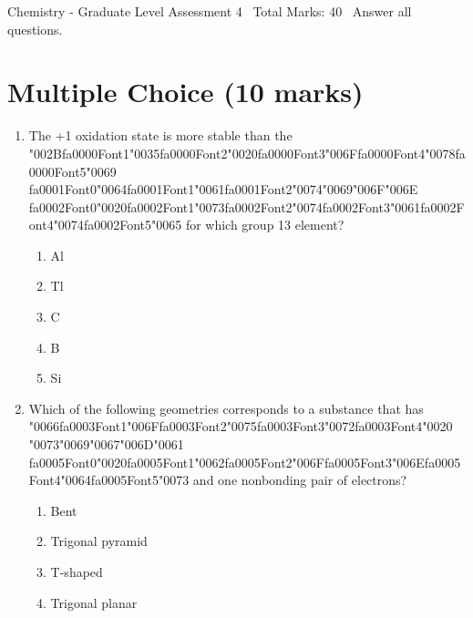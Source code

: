 \documentclass[12pt]{article}
\begin{document}
\begin{center}
Chemistry - Graduate Level Assessment 4 \
Total Marks: 40 \
Answer all questions.
\end{center}

\section*{Multiple Choice (10 marks)}
\begin{enumerate}[label=\arabic*.]
\item The +1 oxidation state is more stable than the {\char"002B}{\csname fa0000Font1\endcsname\char"0035}{\csname fa0000Font2\endcsname\char"0020}{\csname fa0000Font3\endcsname\char"006F}{\csname fa0000Font4\endcsname\char"0078}{\csname fa0000Font5\endcsname\char"0069} {\csname fa0001Font0\endcsname\char"0064}{\csname fa0001Font1\endcsname\char"0061}{\csname fa0001Font2\endcsname\char"0074}{\char"0069}{\char"006F}{\char"006E} {\csname fa0002Font0\endcsname\char"0020}{\csname fa0002Font1\endcsname\char"0073}{\csname fa0002Font2\endcsname\char"0074}{\csname fa0002Font3\endcsname\char"0061}{\csname fa0002Font4\endcsname\char"0074}{\csname fa0002Font5\endcsname\char"0065} for which group 13
element?
\begin{enumerate}[label=(\alph*)]
    \item Al
    \item Tl
    \item C
    \item B
    \item Si
\end{enumerate}
\item Which of the following geometries corresponds to a substance that has {\char"0066}{\csname fa0003Font1\endcsname\char"006F}{\csname fa0003Font2\endcsname\char"0075}{\csname fa0003Font3\endcsname\char"0072}{\csname fa0003Font4\endcsname\char"0020} {\char"0073}{\char"0069}{\char"0067}{\char"006D}{\char"0061} {\csname fa0005Font0\endcsname\char"0020}{\csname fa0005Font1\endcsname\char"0062}{\csname fa0005Font2\endcsname\char"006F}{\csname fa0005Font3\endcsname\char"006E}{\csname fa0005Font4\endcsname\char"0064}{\csname fa0005Font5\endcsname\char"0073} and
one nonbonding pair of electrons?
\begin{enumerate}[label=(\alph*)]
    \item Bent
    \item Trigonal pyramid
    \item T-shaped
    \item Trigonal planar

\end{enumerate}
\end{enumerate}
\end{document}
